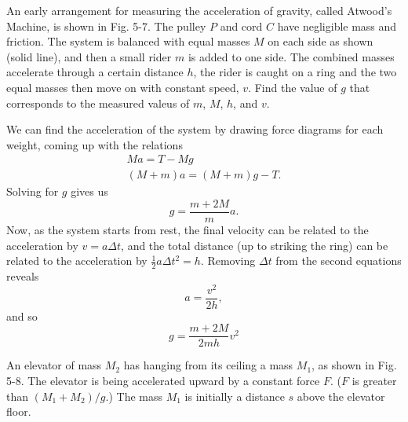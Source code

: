 \documentclass[../feynman-lectures-on-physics.tex]{subfiles}
\begin{document}
\begin{questions}
\begin{solution}
\end{solution}

\question An early arrangement for measuring the acceleration of gravity, called
Atwood's Machine, is shown in Fig. 5-7. The pulley $P$ and cord $C$ have
negligible mass and friction. The system is balanced with equal masses $M$ on
each side as shown (solid line), and then a small rider $m$ is added to one
side. The combined masses accelerate through a certain distance $h$, the rider
is caught on a ring and the two equal masses then move on with constant speed,
$v$. Find the value of $g$ that corresponds to the measured valeus of $m$, $M$,
$h$, and $v$.

\begin{solution}
  We can find the acceleration of the system by drawing force diagrams for each
  weight, coming up with the relations
  \begin{gather*}
    Ma = T - Mg \\
    (M+m)a = (M+m)g - T.
  \end{gather*}
  Solving for $g$ gives us
  \[
    g = \frac{m+2M}{m}a.
  \]
  Now, as the system starts from rest, the final velocity can be related to the
  acceleration by $v = a\Delta{t}$, and the total distance (up to striking the
  ring) can be related to the
  acceleration by $\frac{1}{2}a\Delta{t}^2 = h$. Removing $\Delta{t}$ from the
  second equations reveals
  \[
    a = \frac{v^2}{2h},
  \]
  and so
  \[
    g = \frac{m+2M}{2mh}v^2
  \]



\end{solution}

\question An elevator of mass $M_2$ has hanging from its ceiling a mass $M_1$,
as shown in Fig. 5-8. The elevator is being accelerated upward by a constant
force $F$. ($F$ is greater than $(M_1+M_2)/g$.) The mass $M_1$ is initially a
distance $s$ above the elevator floor.
\begin{parts}

\end{parts}
\end{questions}
\end{document}
